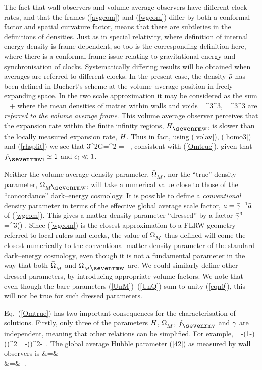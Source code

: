 \documentclass[12pt]{article}
\begin{document}
The fact that wall observers and volume average observers have different
clock rates, and that the frames (\ref{avgeom}) and (\ref{wgeom}) differ
by both a conformal factor and spatial curvature factor, means that there are
subtleties in the definitions of densities. Just as in special relativity,
where definition of internal energy density is frame dependent, so too is
the corresponding definition here, where there is a conformal frame issue
relating to gravitational energy and synchronisation of clocks. Systematically
differing results will be obtained when averages are referred to different
clocks. In the present case, the density $\rhb$ has been defined in
Buchert's scheme at the volume--average position in freely expanding space.
In the two scale approximation it may be considered as the sum
\beq
\rhb=\fvf\rhw+\fv\rhv
\eeq
where the mean densities of matter within walls and voids
\beq
\rhw={\rhb{}\ab{}^3\over\aw^3},\qquad
\rhv={\rhb{}\ab{}^3\over\av^3}
\label{rhsplit}\eeq
are {\em referred to the volume average frame}. This volume average observer
perceives that the expansion rate within the finite infinity regions, $\Hw$, is
slower than the locally measured expansion rate, $\bH$. Thus in fact, using
(\ref{volav}), (\ref{homo3}) and (\ref{rhsplit}) we see that
\beq
{3\Hw^2\rhw{}\pi G}={\fwi\gb^2\OMM{}-\fv}={\fwi\OmMw{}-\epi}
\simeq\OmMw\,,
\eeq
consistent with (\ref{Omtrue}), given that $\fwi\simeq1$ and $\epsilon_i\ll1$.

Neither the volume average density parameter, $\OMM$, nor the ``true'' density
parameter, $\OmMw$, will take a numerical value close to those of the
``concordance'' dark--energy cosmology. It is possible to define a
{\em conventional} density parameter in terms of the
effective global average scale factor, $\ac=\gb^{-1}\ab$ of (\ref{wgeom}).
This gives a matter density parameter ``dressed'' by a
factor $\gb^3$
\beq
\OmM=\gb^3(\tc)\,\OMM\,.
\label{Omrel}\eeq
Since (\ref{wgeom}) is the closest approximation to a FLRW geometry
referred to local rulers and clocks, the value of $\OmM$ thus defined
will come the closest numerically to the conventional matter density
parameter of the standard dark--energy cosmology, even
though it is not a fundamental parameter in the way that both $\OMM$ and
$\OmMw$ are. We could similarly define other dressed parameters, by
introducing appropriate volume factors. We note that
even though the bare parameters (\ref{UnM})--(\ref{UnQ}) sum
to unity (\ref{eqn0}), this will not be true for such dressed parameters.

Eq.\ (\ref{Omtrue}) has two important consequences for the characterisation
of solutions. Firstly, only three of the parameters $\bH$, $\OMM$, $\fv$ and
$\gb$ are independent, meaning that other relations can be simplified. For
example,
\beq \OMQ={-(1-\fv)()^2\over\fv\gb{}}
={-()^2\OMM{}-\gb{}\OMM} \,.
\label{Q3}\eeq
The global average Hubble parameter (\ref{42}) as measured by wall observers
is
\bea
\Hh&=&\gb\bH{}\nonumber\\
&=&\bH{}\,
.\label{hg}
\eea
\end{document}
